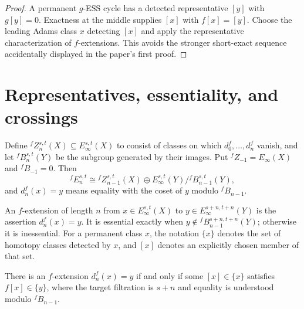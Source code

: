 \begin{proof}
  A permanent $g$-ESS cycle has a detected representative $[y]$ with
  $g[y]=0$.  Exactness at the middle supplies $[x]$ with $f[x]=[y]$.
  Choose the leading Adams class $x$ detecting $[x]$ and apply the
  representative characterization of $f$-extensions.  This avoids the
  stronger short-exact sequence accidentally displayed in the paper's first
  proof.
\end{proof}

\section{Representatives, essentiality, and crossings}

\begin{definition}
  \label{def:fess-cycles-boundaries}
  \notready
  Define ${}^fZ_n^{s,t}(X)\subseteq E_\infty^{s,t}(X)$ to consist of classes
  on which $d_0^f,\ldots,d_n^f$ vanish, and let
  ${}^fB_n^{s,t}(Y)$ be the subgroup generated by their images.  Put
  ${}^fZ_{-1}=E_\infty(X)$ and ${}^fB_{-1}=0$.  Then
  \[
    {}^fE_n^{s,t}\cong{}^fZ_{n-1}^{s,t}(X)\oplus
      E_\infty^{s,t}(Y)/{}^fB_{n-1}^{s,t}(Y),
  \]
  and $d_n^f(x)=y$ means equality with the coset of $y$ modulo
  ${}^fB_{n-1}$.
\end{definition}

\begin{definition}
  \label{def:f-extension-essential}
  \notready
  An $f$-extension of length $n$ from
  $x\in E_\infty^{s,t}(X)$ to
  $y\in E_\infty^{s+n,t+n}(Y)$ is the assertion $d_n^f(x)=y$.
  It is essential exactly when
  $y\notin{}^fB_{n-1}^{s+n,t+n}(Y)$; otherwise it is inessential.  For a
  permanent class $x$, the notation $\{x\}$ denotes the set of homotopy
  classes detected by $x$, and $[x]$ denotes an explicitly chosen member of
  that set.
\end{definition}

\begin{proposition}
  \label{prop:fextension-iff-detected}
  \notready
  There is an $f$-extension $d_n^f(x)=y$ if and only if some
  $[x]\in\{x\}$ satisfies $f[x]\in\{y\}$, where the target filtration is
  $s+n$ and equality is understood modulo ${}^fB_{n-1}$.
\end{proposition}

